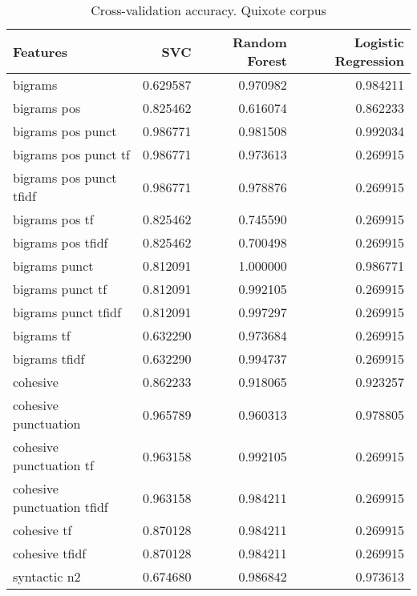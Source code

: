 \documentclass{article}
\begin{document}
\begin{table}
\centering
\caption{Cross-validation accuracy. Quixote corpus}
\begin{tabular}{lrrr}
\toprule
{Features} &       SVC &  Random Forest &  Logistic Regression \\
\midrule
bigrams                    &  0.629587 &       0.970982 &             0.984211 \\
bigrams pos                &  0.825462 &       0.616074 &             0.862233 \\
bigrams pos punct          &  0.986771 &       0.981508 &             0.992034 \\
bigrams pos punct tf       &  0.986771 &       0.973613 &             0.269915 \\
bigrams pos punct tfidf    &  0.986771 &       0.978876 &             0.269915 \\
bigrams pos tf             &  0.825462 &       0.745590 &             0.269915 \\
bigrams pos tfidf          &  0.825462 &       0.700498 &             0.269915 \\
bigrams punct              &  0.812091 &       1.000000 &             0.986771 \\
bigrams punct tf           &  0.812091 &       0.992105 &             0.269915 \\
bigrams punct tfidf        &  0.812091 &       0.997297 &             0.269915 \\
bigrams tf                 &  0.632290 &       0.973684 &             0.269915 \\
bigrams tfidf              &  0.632290 &       0.994737 &             0.269915 \\
cohesive                   &  0.862233 &       0.918065 &             0.923257 \\
cohesive punctuation       &  0.965789 &       0.960313 &             0.978805 \\
cohesive punctuation tf    &  0.963158 &       0.992105 &             0.269915 \\
cohesive punctuation tfidf &  0.963158 &       0.984211 &             0.269915 \\
cohesive tf                &  0.870128 &       0.984211 &             0.269915 \\
cohesive tfidf             &  0.870128 &       0.984211 &             0.269915 \\
syntactic n2               &  0.674680 &       0.986842 &             0.973613 \\

\end{tabular}
\end{table}
\end{document}
